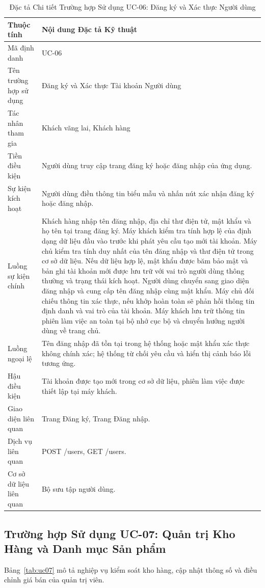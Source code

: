 \begin{table}[H]
\centering
\caption{Đặc tả Chi tiết Trường hợp Sử dụng UC-06: Đăng ký và Xác thực Người dùng}
\label{tab:uc06}
\begin{tabularx}{\textwidth}{p{3.5cm}X}
\toprule
\textbf{Thuộc tính} & \textbf{Nội dung Đặc tả Kỹ thuật} \\
\midrule
Mã định danh & UC-06 \\
Tên trường hợp sử dụng & Đăng ký và Xác thực Tài khoản Người dùng \\
Tác nhân tham gia & Khách vãng lai, Khách hàng \\
Tiền điều kiện & Người dùng truy cập trang đăng ký hoặc đăng nhập của ứng dụng. \\
Sự kiện kích hoạt & Người dùng điền thông tin biểu mẫu và nhấn nút xác nhận đăng ký hoặc đăng nhập. \\
Luồng sự kiện chính & 
Khách hàng nhập tên đăng nhập, địa chỉ thư điện tử, mật khẩu và họ tên tại trang đăng ký.
Máy khách kiểm tra tính hợp lệ của định dạng dữ liệu đầu vào trước khi phát yêu cầu tạo mới tài khoản.
Máy chủ kiểm tra tính duy nhất của tên đăng nhập và thư điện tử trong cơ sở dữ liệu.
Nếu dữ liệu hợp lệ, mật khẩu được băm bảo mật và bản ghi tài khoản mới được lưu trữ với vai trò người dùng thông thường và trạng thái kích hoạt.
Người dùng chuyển sang giao diện đăng nhập và cung cấp tên đăng nhập cùng mật khẩu.
Máy chủ đối chiếu thông tin xác thực, nếu khớp hoàn toàn sẽ phản hồi thông tin định danh và vai trò của tài khoản.
Máy khách lưu trữ thông tin phiên làm việc an toàn tại bộ nhớ cục bộ và chuyển hướng người dùng về trang chủ. \\
Luồng ngoại lệ & Tên đăng nhập đã tồn tại trong hệ thống hoặc mật khẩu xác thực không chính xác; hệ thống từ chối yêu cầu và hiển thị cảnh báo lỗi tương ứng. \\
Hậu điều kiện & Tài khoản được tạo mới trong cơ sở dữ liệu, phiên làm việc được thiết lập tại máy khách. \\
Giao diện liên quan & Trang Đăng ký, Trang Đăng nhập. \\
Dịch vụ liên quan & POST /users, GET /users. \\
Cơ sở dữ liệu liên quan & Bộ sưu tập người dùng. \\
\bottomrule
\end{tabularx}
\end{table}

\subsection{Trường hợp Sử dụng UC-07: Quản trị Kho Hàng và Danh mục Sản phẩm}
Bảng~\ref{tab:uc07} mô tả nghiệp vụ kiểm soát kho hàng, cập nhật thông số và điều chỉnh giá bán của quản trị viên.

